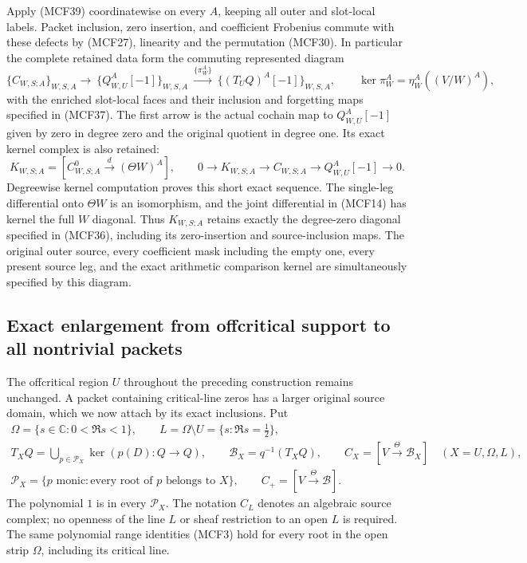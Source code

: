 Apply (MCF39) coordinatewise on every $A$, keeping all outer and
slot-local labels.  Packet inclusion, zero insertion, and coefficient
Frobenius commute with these defects by (MCF27), linearity and the
permutation (MCF30).  In particular the complete retained data form
the commuting represented diagram
\[
\{C_{W,S;A}\}_{W,S,A} \longrightarrow\
\{Q_{W,U}^A[-1]\}_{W,S,A}\ \xrightarrow{\{\pi_W^A\}}\
\{(T_UQ)^A[-1]\}_{W,S,A},\qquad
\ker\pi_W^A=\eta_W^A((V/W)^A),
\tag{MCF40}
\]
with the enriched slot-local faces and their inclusion and forgetting
maps specified in (MCF37).  The first arrow is the actual cochain map
to $Q_{W,U}^A[-1]$ given by zero in degree zero and the original
quotient in degree one.  Its exact kernel complex is also retained:
\[
K_{W,S;A}=[C_{W,S;A}^0\xrightarrow{d}(\Theta W)^A],\qquad
0\longrightarrow K_{W,S;A}\longrightarrow C_{W,S;A}
\longrightarrow Q_{W,U}^A[-1]\longrightarrow0.
\tag{MCF40a}
\]
Degreewise kernel computation proves this short exact sequence.
The single-leg differential onto $\Theta W$ is an isomorphism, and
the joint differential in (MCF14) has kernel the full $W$ diagonal.
Thus $K_{W,S;A}$ retains exactly the degree-zero diagonal specified
in (MCF36), including its zero-insertion and source-inclusion maps.
The original outer source,
every coefficient mask including the empty one, every present source
leg, and the exact arithmetic comparison kernel are simultaneously
specified by this diagram.

\subsection{Exact enlargement from offcritical support to all nontrivial packets}

The offcritical region $U$ throughout the preceding construction remains
unchanged.  A packet containing critical-line zeros has a larger original
source domain, which we now attach by its exact inclusions.  Put
\[
\begin{gathered}
\Omega=\{s\in\mathbb C:0<\Re s<1\},\qquad
L=\Omega\setminus U=\{s:\Re s=\tfrac12\},\\
T_XQ=\bigcup_{p\in\mathcal P_X}\ker(p(D):Q\to Q),\qquad
\mathscr B_X=q^{-1}(T_XQ),\qquad
C_X=[V\xrightarrow\Theta\mathscr B_X]\quad(X=U,\Omega,L),\\
\mathcal P_X=\{p\text{ monic}:\text{every root of }p\text{ belongs to }X\},
\qquad C_+=[V\xrightarrow\Theta\mathscr B].
\end{gathered}
\tag{MCF41}
\]
The polynomial $1$ is in every $\mathcal P_X$.  The notation $C_L$
denotes an algebraic source complex; no openness of the line $L$
or sheaf restriction to an open $L$ is required.  The same polynomial
range identities (MCF3) hold for every root in the open strip
$\Omega$, including its critical line.


